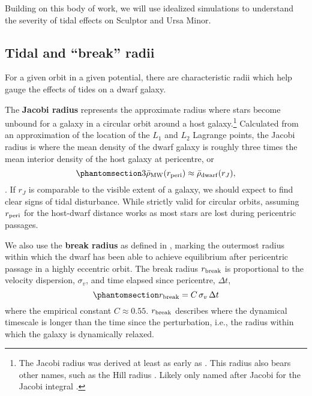 Building on this body of work, we will use idealized simulations to
understand the severity of tidal effects on Sculptor and Ursa Minor.

\subsection{Tidal and ``break'' radii}\label{sec:break_radii}

For a given orbit in a given potential, there are characteristic radii
which help gauge the effects of tides on a dwarf galaxy.

The \textbf{Jacobi radius} represents the approximate radius where stars
become unbound for a galaxy in a circular orbit around a host
galaxy.\footnote{The Jacobi radius was derived at least as early as
  \citet{laplace1798}. This radius also bears other names, such as the
  Hill radius \citep[from][]{hill1878}. Likely only named after Jacobi
  for the Jacobi integral \citep{jacobi1836}.} Calculated from an
approximation of the location of the \(L_1\) and \(L_2\) Lagrange
points, the Jacobi radius is where the mean density of the dwarf galaxy
is roughly three times the mean interior density of the host galaxy at
pericentre, or
\begin{equation}\protect\phantomsection\label{eq:r_jacobi}{
3\bar \rho_{\rm MW}(r_{\rm peri}) \approx \bar \rho_{\rm dwarf}(r_J),
}\end{equation} \citep[ eq. 7-84]{BT1987}. If \(r_J\) is comparable to
the visible extent of a galaxy, we should expect to find clear signs of
tidal disturbance. While strictly valid for circular orbits, assuming
\(r_{\rm peri}\) for the host-dwarf distance works as most stars are
lost during pericentric passages.

We also use the \textbf{break radius} as defined in
\citet{penarrubia+2009}, marking the outermost radius within which the
dwarf has been able to achieve equilibrium after pericentric passage in
a highly eccentric orbit. The break radius \(r_{\rm break}\) is
proportional to the velocity dispersion, \(\sigma_v\), and time elapsed
since pericentre, \(\Delta t\),
\begin{equation}\protect\phantomsection\label{eq:r_break}{
r_{\rm break} = C\,\sigma_{v}\,\Delta t
}\end{equation} where the empirical constant \(C \approx 0.55\).
\(r_{\rm break}\) describes where the dynamical timescale is longer than
the time since the perturbation, i.e., the radius within which the
galaxy is dynamically relaxed.

